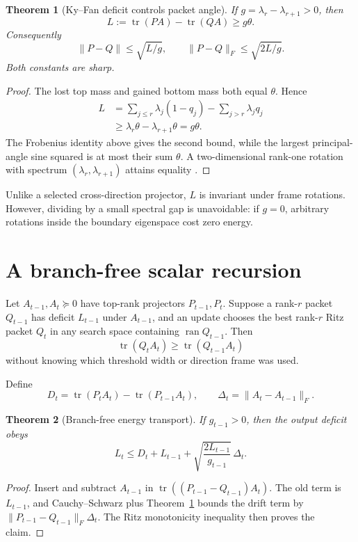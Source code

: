 \documentclass[12pt]{article}
\newtheorem{theorem}{Theorem}
\begin{document}
\begin{theorem}[Ky--Fan deficit controls packet angle]\label{thm:kyfan}
If $g=\lambda_r-\lambda_{r+1}>0$, then
\[
 L:=\operatorname{tr}(PA)-\operatorname{tr}(QA)
 \geq g\theta.
\]
Consequently
\[
 \boxed{\ \|P-Q\|\leq\sqrt{L/g},\qquad
 \|P-Q\|_F\leq\sqrt{2L/g}.\ }
\]
Both constants are sharp.
\end{theorem}
\begin{proof}
The lost top mass and gained bottom mass both equal $\theta$.  Hence
\begin{align*}
L&=\sum_{j\leq r}\lambda_j(1-q_j)-
   \sum_{j>r}\lambda_jq_j\\
 &\geq\lambda_r\theta-\lambda_{r+1}\theta=g\theta.
\end{align*}
The Frobenius identity above gives the second bound, while the largest
principal-angle sine squared is at most their sum $\theta$.  A two-dimensional
rank-one rotation with spectrum $(\lambda_r,\lambda_{r+1})$ attains equality
\citep{Bhatia1997}.
\end{proof}

Unlike a selected cross-direction projector, $L$ is invariant under frame
rotations.  However, dividing by a small spectral gap is unavoidable: if
$g=0$, arbitrary rotations inside the boundary eigenspace cost zero energy.

\section{A branch-free scalar recursion}
Let $A_{t-1},A_t\succeq0$ have top-rank projectors $P_{t-1},P_t$.  Suppose a
rank-$r$ packet $Q_{t-1}$ has deficit $L_{t-1}$ under $A_{t-1}$, and an update
chooses the best rank-$r$ Ritz packet $Q_t$ in any search space containing
$\operatorname{ran}Q_{t-1}$.  Then
\[
 \operatorname{tr}(Q_tA_t)\geq
 \operatorname{tr}(Q_{t-1}A_t)
\]
without knowing which threshold width or direction frame was used.

Define
\[
 D_t=\operatorname{tr}(P_tA_t)-
     \operatorname{tr}(P_{t-1}A_t),
 \qquad \Delta_t=\|A_t-A_{t-1}\|_F.
\]

\begin{theorem}[Branch-free energy transport]\label{thm:scalar}
If $g_{t-1}>0$, then the output deficit obeys
\[
 L_t\leq D_t+L_{t-1}
 +\sqrt{\frac{2L_{t-1}}{g_{t-1}}}\,\Delta_t.
\]
\end{theorem}
\begin{proof}
Insert and subtract $A_{t-1}$ in
$\operatorname{tr}((P_{t-1}-Q_{t-1})A_t)$.  The old term is
$L_{t-1}$, and Cauchy--Schwarz plus Theorem~\ref{thm:kyfan} bounds the drift
term by
$\|P_{t-1}-Q_{t-1}\|_F\Delta_t$.
The Ritz monotonicity inequality then proves the claim.
\end{proof}
\end{document}
